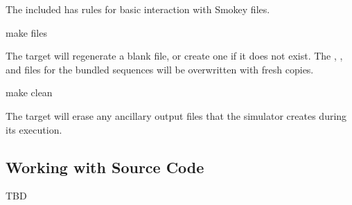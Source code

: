 \begin{DirectoryTree}
\end{DirectoryTree}

The included  has rules for basic interaction with Smokey
files.

\begin{CommandLine}
make files
\end{CommandLine}

The  target will regenerate a blank  file,
or create one if it does not exist.  The
, , and
 files for the bundled sequences will be overwritten with
fresh copies.

\begin{CommandLine}
make clean
\end{CommandLine}

The  target will erase any ancillary output files that the
simulator creates during its execution.

\subsection{Working with Source Code}

TBD

